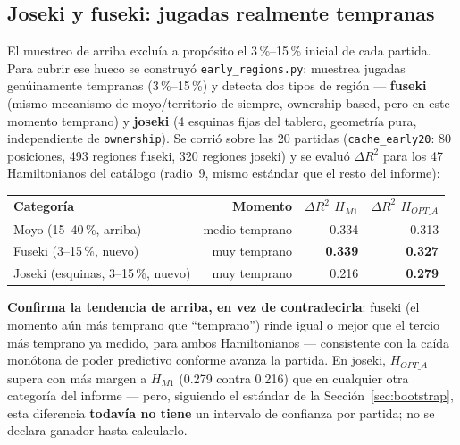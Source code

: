 \documentclass[11pt, a4paper]{article}
\newcommand{\TH}[1]{\cellcolor{cTHbg}\color{white}\textbf{#1}}
\newcommand{\good}[1]{\color{cGood}\textbf{#1}}
\begin{document}
\subsection{Joseki y fuseki: jugadas realmente tempranas}
\label{sec:joseki-fuseki}

El muestreo de arriba exclu\'ia a prop\'osito el 3\,\%--15\,\%
inicial de cada partida. Para cubrir ese hueco se construy\'o
\texttt{early\_regions.py}: muestrea jugadas gen\'uinamente tempranas
(3\,\%--15\,\%) y detecta dos tipos de regi\'on --- \textbf{fuseki}
(mismo mecanismo de moyo/territorio de siempre, ownership-based, pero
en este momento temprano) y \textbf{joseki} (4 esquinas fijas del
tablero, geometr\'ia pura, independiente de \texttt{ownership}). Se
corri\'o sobre las 20 partidas (\texttt{cache\_early20}: 80 posiciones,
493 regiones fuseki, 320 regiones joseki) y se evalu\'o $\Delta R^2$
para los 47 Hamiltonianos del cat\'alogo (radio~9, mismo est\'andar que
el resto del informe):

\medskip
\begin{center}
\begin{tabular}{lrrr}
  \TH{Categor\'ia} & \TH{Momento} & \TH{$\Delta R^2$ $H_{M1}$} & \TH{$\Delta R^2$ $H_{OPT\_A}$} \\[1pt]
  Moyo (15--40\,\%, arriba)          & medio-temprano & 0.334 & 0.313 \\
  Fuseki (3--15\,\%, nuevo)          & muy temprano   & \good{0.339} & \good{0.327} \\
  Joseki (esquinas, 3--15\,\%, nuevo) & muy temprano  & 0.216 & \good{0.279} \\
\end{tabular}
\end{center}
\medskip

\begin{tcolorbox}[quotebox]
  \textbf{Confirma la tendencia de arriba, en vez de contradecirla}:
  fuseki (el momento a\'un m\'as temprano que ``temprano'') rinde igual
  o mejor que el tercio m\'as temprano ya medido, para ambos
  Hamiltonianos --- consistente con la ca\'ida mon\'otona de poder
  predictivo conforme avanza la partida. En joseki, $H_{OPT\_A}$ supera
  con m\'as margen a $H_{M1}$ (0.279 contra 0.216) que en cualquier
  otra categor\'ia del informe --- pero, siguiendo el est\'andar de la
  Secci\'on~\ref{sec:bootstrap}, esta diferencia \textbf{todav\'ia no
  tiene} un intervalo de confianza por partida; no se declara ganador
  hasta calcularlo.
\end{tcolorbox}
\end{document}
